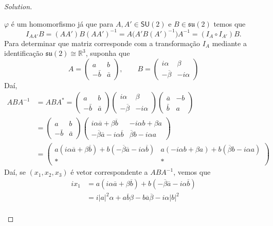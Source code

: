 \begin{proof}[Solution]
\begin{enumerate}[label=\alph*.]
	$\varphi$ é um homomorfismo já que para $A,A'\in  \mathsf{SU}(2)$ e $B\in\mathfrak{su}(2)$ temos que
	\[I_{A A'}B=(A A')B(A A')^{-1}=A\Big(A'B(A')^{-1}\Big)A^{-1}=(I_A \circ  I_{A'})B.\]
	Para determinar que matriz corresponde com a transformação $I_A$ mediante a identificação $\mathfrak{su}(2) \cong \mathbb{R}^{3}$, suponha que
	\[A=\begin{pmatrix} a&b\\-\bar{b}&\bar{a} \end{pmatrix}, \qquad B=\begin{pmatrix} i\alpha &\beta\\-\overline{\beta} &-i\alpha\end{pmatrix}  \]
	Daí,
\begin{align*}
	ABA^{-1}&=ABA^*=\begin{pmatrix} a&b\\-\bar{b}&\bar{a} \end{pmatrix}\begin{pmatrix} i\alpha &\beta\\-\overline{\beta}&-i\alpha \end{pmatrix}\begin{pmatrix} \overline{a}&-b\\\bar{b}&a \end{pmatrix} \\
&=\begin{pmatrix} a&b\\-\bar{b}&\bar{a} \end{pmatrix}\begin{pmatrix} i \alpha\overline{a}+\beta\overline{b} & -i\alpha b + \beta a\\ -\overline{\beta}\overline{a}-i\alpha \overline{b} & \overline{\beta}b-i \alpha a \end{pmatrix}\\
&=\begin{pmatrix} a(i \alpha \overline{a}+\beta\overline{b})+b(-\overline{\beta}\overline{a}-i\alpha\overline{b}) &  a(-i \alpha b+\beta a)+b(\overline{\beta}b-i\alpha a)\\ * & * \end{pmatrix} 
\end{align*}
Daí, se $(x_1,x_2,x_3)$ é vetor correspondente a $ABA^{-1}$, vemos que
\begin{align*}
	ix_1&=a(i \alpha \overline{a}+\beta\overline{b})+b(-\overline{\beta}\overline{a}-i\alpha\overline{b}) \\
	&=i|a|^2\alpha+a\overline{b}\beta-b\overline{a}\overline{\beta}-i\alpha|b|^2\\

\end{align*}
\end{enumerate}
\end{proof}
